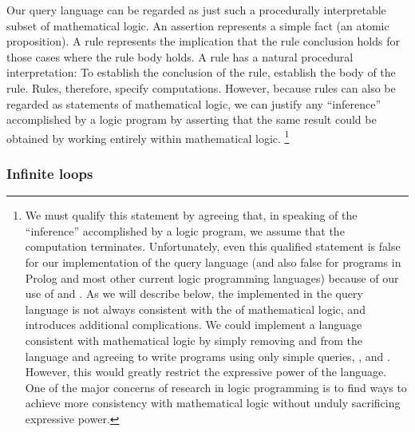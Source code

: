 Our query language can be regarded as just such a procedurally interpretable subset of mathematical logic.
An assertion represents a simple fact (an atomic proposition).
A rule represents the implication that the rule conclusion holds for those cases where the rule body holds.
A rule has a natural procedural interpretation:
To establish the conclusion of the rule, establish the body of the rule.
Rules, therefore, specify computations.
However, because rules can also be regarded as statements of mathematical logic, we can justify any “inference” accomplished by a logic program by asserting that the same result could be obtained by working entirely within mathematical logic.%
\footnote{
	We must qualify this statement by agreeing that, in speaking of the “inference” accomplished by a logic program, we assume that the computation terminates.
	Unfortunately, even this qualified statement is false for our implementation of the query language (and also false for programs in Prolog and most other current logic programming languages) because of our use of  and .
	As we will describe below, the  implemented in the query language is not always consistent with the  of mathematical logic, and  introduces additional complications.
	We could implement a language consistent with mathematical logic by simply removing  and  from the language and agreeing to write programs using only simple queries, , and .
	However, this would greatly restrict the expressive power of the language.
	One of the major concerns of research in logic programming is to find ways to achieve more consistency with mathematical logic without unduly sacrificing expressive power.
}



\subsubsection*{Infinite loops}

